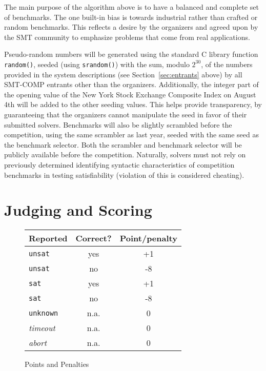 \documentclass[12pt]{article}
\begin{document}
The main purpose of the algorithm above is to have a balanced and complete set
of benchmarks.  The one built-in bias is towards industrial rather than crafted
or random benchmarks.  This reflects a desire by the organizers and agreed upon
by the SMT community to emphasize problems that come from real applications.

Pseudo-random numbers will be generated using the standard C library
function \texttt{random()}, seeded (using \texttt{srandom()}) with the
sum, modulo $2^{30}$, of the numbers provided in the system
descriptions (see Section~\ref{sec:entrants} above) by all SMT-COMP
entrants other than the organizers.  Additionally, the integer part of
the opening value of the New York Stock Exchange Composite Index on August 4th
will be added to the other seeding values.  This helps provide transparency,
by guaranteeing that the organizers cannot manipulate the seed in
favor of their submitted solvers.  Benchmarks will also be slightly
scrambled before the competition, using the same scrambler as last year,
seeded with the same seed as the benchmark selector.  Both the
scrambler and benchmark selector will be publicly available before the
competition.  Naturally, solvers must not rely on previously
determined identifying syntactic characteristics of competition
benchmarks in testing satisfiability (violation of this is considered
cheating).

\section{Judging and Scoring}
\label{sec:judging}

\begin{figure}
\begin{center}
\begin{tabular}{|l|c|c|}
\hline \textbf{Reported} & \textbf{Correct?} &
\textbf{Point/penalty}\\ \hline \texttt{unsat} & yes & +1 \\ \hline
\texttt{unsat} & no & -8 \\ \hline \texttt{sat} & yes & +1 \\ \hline
\texttt{sat} & no & -8 \\ \hline \texttt{unknown} & n.a. & 0 \\ \hline
\emph{timeout} & n.a. & 0 \\ \hline
\emph{abort} & n.a. & 0 \\ \hline
\end{tabular}
\end{center}
\caption{\label{fig:points}Points and Penalties}
\end{figure}
\end{document}
